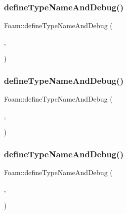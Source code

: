 \mbox{\label{namespaceFoam_af75f7542ef35bb648205f506c66b1467}} 
\subsubsection{\texorpdfstring{define\+Type\+Name\+And\+Debug()}{defineTypeNameAndDebug()}\hspace{0.1cm}{\footnotesize\ttfamily [15/50]}}
{\footnotesize\ttfamily Foam\+::define\+Type\+Name\+And\+Debug (\begin{DoxyParamCaption}\item[{\hyperlink{classFoam_1_1pump}{pump}}]{,  }\item[{0}]{ }\end{DoxyParamCaption})}

\mbox{\label{namespaceFoam_a5d7483bbd8dff1331747db25802e4473}} 
\subsubsection{\texorpdfstring{define\+Type\+Name\+And\+Debug()}{defineTypeNameAndDebug()}\hspace{0.1cm}{\footnotesize\ttfamily [16/50]}}
{\footnotesize\ttfamily Foam\+::define\+Type\+Name\+And\+Debug (\begin{DoxyParamCaption}\item[{\hyperlink{classFoam_1_1structure}{structure}}]{,  }\item[{0}]{ }\end{DoxyParamCaption})}

\mbox{\label{namespaceFoam_ac611a00dc2f8b0def6326c9c39c387cc}} 
\subsubsection{\texorpdfstring{define\+Type\+Name\+And\+Debug()}{defineTypeNameAndDebug()}\hspace{0.1cm}{\footnotesize\ttfamily [17/50]}}
{\footnotesize\ttfamily Foam\+::define\+Type\+Name\+And\+Debug (\begin{DoxyParamCaption}\item[{\hyperlink{classFoam_1_1contactPartitionModel}{contact\+Partition\+Model}}]{,  }\item[{0}]{ }\end{DoxyParamCaption})}

